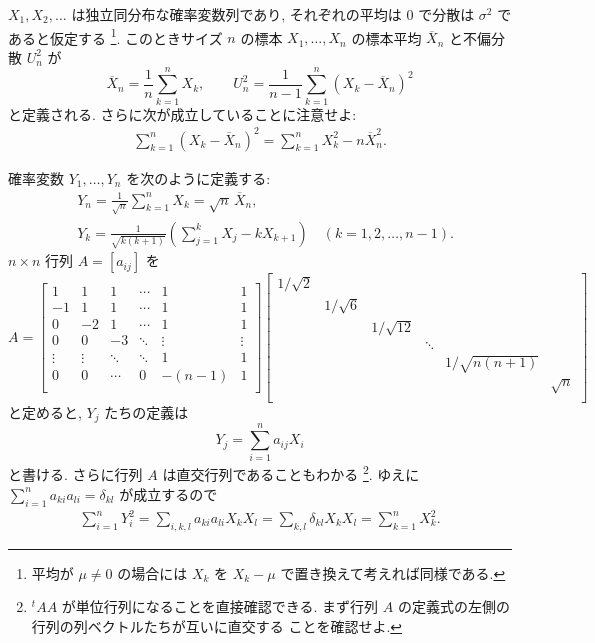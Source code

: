 \documentclass[12pt,twoside]{jarticle}
\newcommand\Xbar{{\overline X}}
\theoremstyle{jplain}
\theoremstyle{jplain}
\theoremstyle{jplain}
\numberwithin{theorem}{section}
\numberwithin{equation}{section}
\numberwithin{figure}{section}
\numberwithin{table}{section}
\begin{document}
$X_1,X_2,\ldots$ は独立同分布な確率変数列であり,
それぞれの平均は $0$ で分散は $\sigma^2$ であると仮定する%
\footnote{平均が $\mu\ne 0$ の場合には $X_k$ を $X_k-\mu$ で置き換えて考えれば同様である.}.
このときサイズ $n$ の標本 $X_1,\ldots,X_n$ の標本平均 $\Xbar_n$ と不偏分散 $U_n^2$ が
\[
\Xbar_n = \frac{1}{n} \sum_{k=1}^n X_k, \qquad
U_n^2 = \frac{1}{n-1}\sum_{k=1}^n (X_k - \Xbar_n)^2
\]
と定義される. さらに次が成立していることに注意せよ:
\begin{align*}
\sum_{k=1}^n (X_k - \Xbar_n)^2 = \sum_{k=1}^n X_k^2 - n\Xbar_n^2.
\end{align*}

確率変数 $Y_1,\ldots,Y_n$ を次のように定義する:
\begin{align*}
&
Y_n = \frac{1}{\sqrt{n}}\sum_{k=1}^n X_k = \sqrt{n}\,\Xbar_n,
\\ &
Y_k = \frac{1}{\sqrt{k(k+1)}}\left(\sum_{j=1}^k X_j - k X_{k+1}\right)
\quad (k=1,2,\ldots,n-1).
\end{align*}
$n\times n$ 行列 $A=[a_{ij}]$ を
\[
A=
\begin{bmatrix}
 1 & 1 & 1 & \cdots & 1 & 1 \\
-1 & 1 & 1 & \cdots & 1 & 1 \\
 0 &-2 & 1 & \cdots & 1 & 1 \\
 0 & 0 &-3 & \ddots & \vdots & \vdots \\
 \vdots & \vdots & \ddots & \ddots & 1 & 1 \\
 0 & 0 & \cdots & 0 & -(n-1) & 1 \\
\end{bmatrix}
\begin{bmatrix}
1/\sqrt{2} \\
           & 1/\sqrt{6} \\
           &          & 1/\sqrt{12} \\
           &          &           & \ddots \\
           &          &           &        & 1/\sqrt{n(n+1)} \\
           &          &           &        &               & \sqrt{n} \\
\end{bmatrix}
\]
と定めると, $Y_j$ たちの定義は
\[
Y_j = \sum_{i=1}^n a_{ij} X_i
\]
と書ける. さらに行列 $A$ は直交行列であることもわかる%
\footnote{${}^t AA$ が単位行列になることを直接確認できる.
まず行列 $A$ の定義式の左側の行列の列ベクトルたちが互いに直交する
ことを確認せよ.}.
ゆえに $\sum_{i=1}^n a_{ki}a_{li}=\delta_{kl}$ が成立するので
\begin{align*}
\sum_{i=1}^n Y_i^2
= \sum_{i,k,l} a_{ki}a_{li} X_k X_l
= \sum_{k,l}\delta_{kl} X_k X_l
= \sum_{k=1}^n X_k^2.
\end{align*}
\end{document}
